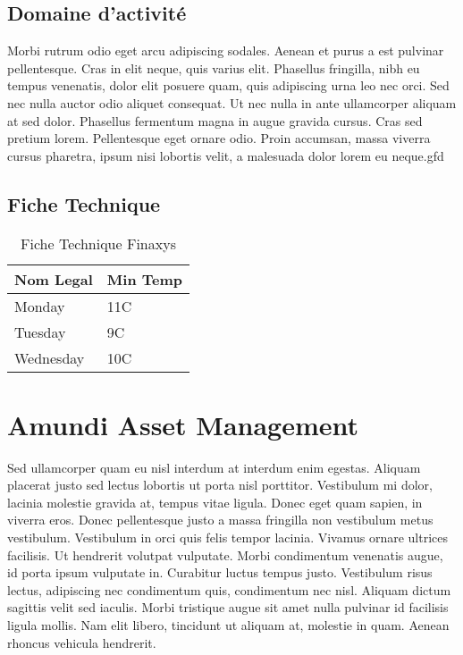 
\subsection{Domaine d'activité}
Morbi rutrum odio eget arcu adipiscing sodales. Aenean et purus a est pulvinar pellentesque. Cras in elit neque, quis varius elit. Phasellus fringilla, nibh eu tempus venenatis, dolor elit posuere quam, quis adipiscing urna leo nec orci. Sed nec nulla auctor odio aliquet consequat. Ut nec nulla in ante ullamcorper aliquam at sed dolor. Phasellus fermentum magna in augue gravida cursus. Cras sed pretium lorem. Pellentesque eget ornare odio. Proin accumsan, massa viverra cursus pharetra, ipsum nisi lobortis velit, a malesuada dolor lorem eu neque.gfd

\subsection{Fiche Technique}
\begin{table}[htp]
    \begin{center}
        \begin{tabular}{ | l | l |}
            \hline
            Nom Legal & Min Temp  \\ \hline
            Monday & 11C \\ \hline
            Tuesday & 9C  \\ \hline
            Wednesday & 10C  \\
            \hline
            \end{tabular}
            \caption{Fiche Technique Finaxys}
    \end{center}
\end{table}


\section{Amundi Asset Management}

Sed ullamcorper quam eu nisl interdum at interdum enim egestas. Aliquam placerat justo sed lectus lobortis ut porta nisl porttitor. Vestibulum mi dolor, lacinia molestie gravida at, tempus vitae ligula. Donec eget quam sapien, in viverra eros. Donec pellentesque justo a massa fringilla non vestibulum metus vestibulum. Vestibulum in orci quis felis tempor lacinia. Vivamus ornare ultrices facilisis. Ut hendrerit volutpat vulputate. Morbi condimentum venenatis augue, id porta ipsum vulputate in. Curabitur luctus tempus justo. Vestibulum risus lectus, adipiscing nec condimentum quis, condimentum nec nisl. Aliquam dictum sagittis velit sed iaculis. Morbi tristique augue sit amet nulla pulvinar id facilisis ligula mollis. Nam elit libero, tincidunt ut aliquam at, molestie in quam. Aenean rhoncus vehicula hendrerit.

